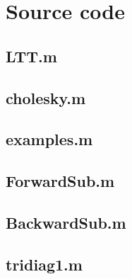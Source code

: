 \documentclass[12pt]{article}
\begin{document}
\section{Source code}
\subsection{LTT.m}


\subsection{cholesky.m}


\subsection{examples.m}


\subsection{ForwardSub.m}


\subsection{BackwardSub.m}


\subsection{tridiag1.m}


\end{document}
